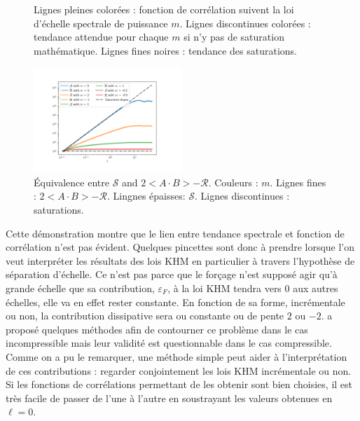 \begin{figure}
\begin{subfigure}[b]{0.496\textwidth}
     \end{subfigure}
        \caption{Lignes pleines colorées : fonction de corrélation suivent la loi d'échelle spectrale de puissance $m$. Lignes discontinues colorées : tendance attendue pour chaque $m$ si n'y pas de saturation mathématique. Lignes fines noires : tendance des saturations. }
        \label{fig:sat_trends}
\includegraphics[width=0.5\textwidth,trim = 2cm 0.5cm 2cm 2cm, clip]{./Part_Appendix/images/sat_comp_2}
\caption{Équivalence entre $\mathcal{S}$ and $2<A\cdot B> - \mathcal{R}$. Couleurs : $m$. Lignes fines : $2<A\cdot B> - \mathcal{R}$. Lingnes épaisses: $\mathcal{S}$. Lignes discontinues : saturations. }
\label{fig:sat_comp}
\end{figure}


Cette démonstration montre que le lien entre tendance spectrale et fonction de corrélation n'est pas évident. Quelques pincettes sont donc à prendre lorsque l'on veut interpréter les résultats des lois \ac{KHM} en particulier à travers l'hypothèse de séparation d'échelle. Ce n'est pas parce que le forçage n'est supposé agir qu'à grande échelle que sa contribution, $\varepsilon_F$, à la loi \ac{KHM} tendra vers 0 aux autres échelles, elle va en effet rester constante. En fonction de sa forme, incrémentale ou non, la contribution dissipative sera ou constante ou de pente $2$ ou $-2$. \cite{ferrand_multi-scale_2021} a proposé quelques méthodes afin de contourner ce problème dans le cas incompressible mais leur validité est questionnable dans le cas compressible. Comme on a pu le remarquer, une méthode simple peut aider à l'interprétation de ces contributions : regarder conjointement les lois \ac{KHM} incrémentale ou non. Si les fonctions de corrélations permettant de les obtenir sont bien choisies, il est très facile de passer de l'une à l'autre en soustrayant les valeurs obtenues en $\ell=0$. 
